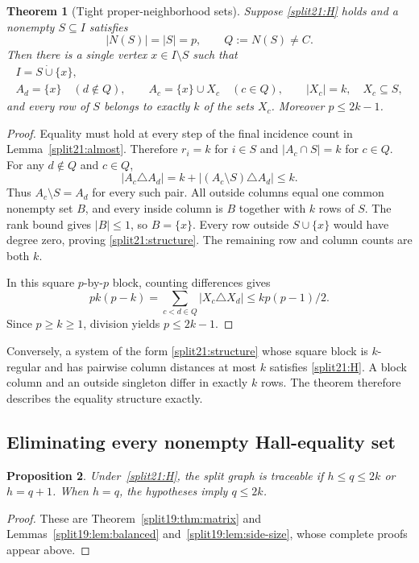 \documentclass[11pt,a4paper]{article}
\newtheorem{theorem}{Theorem}[section]
\newtheorem{proposition}[theorem]{Proposition}
\theoremstyle{definition}\newtheorem{definition}[theorem]{Definition}
\theoremstyle{remark}\newtheorem{remark}[theorem]{Remark}
\begin{document}
\begin{theorem}[Tight proper-neighborhood sets]\label{split21:tight}
Suppose \eqref{split21:H} holds and a nonempty $S\subseteq I$ satisfies
\[
 |N(S)|=|S|=p,\qquad Q:=N(S)\ne C.
\]
Then there is a single vertex $x\in I\setminus S$ such that
\begin{equation}\label{split21:structure}
\begin{gathered}
 I=S\mathbin{\dot\cup}\{x\},\\
 A_d=\{x\}\quad(d\notin Q),\qquad
 A_c=\{x\}\cup X_c\quad(c\in Q),\qquad |X_c|=k,\quad X_c\subseteq S,
\end{gathered}
\end{equation}
and every row of $S$ belongs to exactly $k$ of the sets $X_c$.
Moreover $p\leq2k-1$.
\end{theorem}
\begin{proof}
Equality must hold at every step of the final incidence count in
Lemma~\ref{split21:almost}. Therefore $r_i=k$ for $i\in S$ and
$|A_c\cap S|=k$ for $c\in Q$.
For any $d\notin Q$ and $c\in Q$,
\[
 |A_c\triangle A_d|
 = k+|(A_c\setminus S)\triangle A_d|\leq k.
\]
Thus $A_c\setminus S=A_d$ for every such pair. All outside columns equal
one common nonempty set $B$, and every inside column is $B$ together with
$k$ rows of $S$. The rank bound gives $|B|\leq1$, so $B=\{x\}$.
Every row outside $S\cup\{x\}$ would have degree zero, proving
\eqref{split21:structure}. The remaining row and column counts are both $k$.

In this square $p$-by-$p$ block, counting differences gives
\[
 pk(p-k)=\sum_{c<d\in Q}|X_c\triangle X_d|
 \leq kp(p-1)/2.
\]
Since $p\geq k\geq1$, division yields $p\leq2k-1$.
\end{proof}

Conversely, a system of the form \eqref{split21:structure} whose square block is
$k$-regular and has pairwise column distances at most $k$ satisfies
\eqref{split21:H}. A block column and an outside singleton differ in exactly $k$
rows. The theorem therefore describes the equality structure exactly.



\subsection{Eliminating every nonempty Hall-equality set}
\begin{proposition}\label{split21:inputs}
Under~\eqref{split21:H}, the split graph is traceable if $h\le q\le2k$
or $h=q+1$. When $h=q$, the hypotheses imply $q\le2k$.
\end{proposition}
\begin{proof}
These are Theorem~\ref{split19:thm:matrix} and
Lemmas~\ref{split19:lem:balanced} and~\ref{split19:lem:side-size},
whose complete proofs appear above.
\end{proof}
\end{document}
